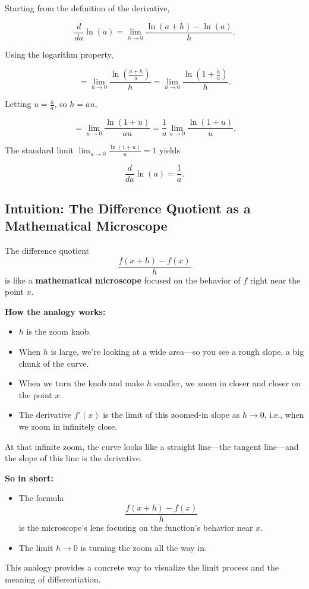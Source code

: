 \documentclass[10pt,twocolumn]{article}
\begin{document}
Starting from the definition of the derivative,

\[
\frac{d}{da} \ln(a) = \lim_{h \to 0} \frac{\ln(a + h) - \ln(a)}{h}.
\]

Using the logarithm property,

\[
= \lim_{h \to 0} \frac{\ln\left(\frac{a+h}{a}\right)}{h} = \lim_{h \to 0} \frac{\ln\left(1 + \frac{h}{a}\right)}{h}.
\]

Letting \(u = \frac{h}{a}\), so \(h = a u\),

\[
= \lim_{u \to 0} \frac{\ln(1 + u)}{a u} = \frac{1}{a} \lim_{u \to 0} \frac{\ln(1 + u)}{u}.
\]

The standard limit \(\lim_{u \to 0} \frac{\ln(1 + u)}{u} = 1\) yields

\[
\frac{d}{da} \ln(a) = \frac{1}{a}.
\]

\subsection*{Intuition: The Difference Quotient as a Mathematical Microscope}

The difference quotient
\[
\frac{f(x+h) - f(x)}{h}
\]
is like a \textbf{mathematical microscope} focused on the behavior of \(f\) right near the point \(x\).

\medskip

\textbf{How the analogy works:}

\begin{itemize}
  \item \(h\) is the zoom knob.
  \item When \(h\) is large, we’re looking at a wide area—so you see a rough slope, a big chunk of the curve.
  \item When we turn the knob and make \(h\) smaller, we zoom in closer and closer on the point \(x\).
  \item The derivative \(f'(x)\) is the limit of this zoomed-in slope as \(h \to 0\), i.e., when we zoom in infinitely close.
\end{itemize}

At that infinite zoom, the curve looks like a straight line—the tangent line—and the slope of this line is the derivative.

\medskip

\textbf{So in short:}

\begin{itemize}
  \item The formula
  \[
  \frac{f(x+h) - f(x)}{h}
  \]
  is the microscope’s lens focusing on the function's behavior near \(x\).
  
  \item The limit \(h \to 0\) is turning the zoom all the way in.
\end{itemize}

This analogy provides a concrete way to visualize the limit process and the meaning of differentiation.
\end{document}
